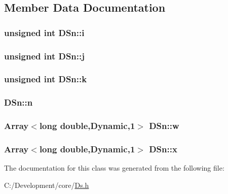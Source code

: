 \subsection{Member Data Documentation}
\hypertarget{class_d_sn_a205b8a78bdbeee3ed57ad7969ee7246e}{
\subsubsection[{i}]{\setlength{\rightskip}{0pt plus 5cm}unsigned int D\-Sn\-::i\hspace{0.3cm}{\ttfamily [private]}}}\label{class_d_sn_a205b8a78bdbeee3ed57ad7969ee7246e}
\hypertarget{class_d_sn_afe7eb12770bc91d87a1fe74ac2929b46}{
\subsubsection[{j}]{\setlength{\rightskip}{0pt plus 5cm}unsigned int D\-Sn\-::j\hspace{0.3cm}{\ttfamily [private]}}}\label{class_d_sn_afe7eb12770bc91d87a1fe74ac2929b46}
\hypertarget{class_d_sn_abbfbd2fec8d17081897e5cf755374149}{
\subsubsection[{k}]{\setlength{\rightskip}{0pt plus 5cm}unsigned int D\-Sn\-::k\hspace{0.3cm}{\ttfamily [private]}}}\label{class_d_sn_abbfbd2fec8d17081897e5cf755374149}
\hypertarget{class_d_sn_a9ff951d6dab4a24ba0296ea175b0962c}{
\subsubsection[{n}]{ D\-Sn\-::n\hspace{0.3cm}{\ttfamily [private]}}}\label{class_d_sn_a9ff951d6dab4a24ba0296ea175b0962c}
\hypertarget{class_d_sn_aebd6954764715ae6dfbb14a7d934b404}{
\subsubsection[{w}]{\setlength{\rightskip}{0pt plus 5cm}Array$<$long double,Dynamic,1$>$ D\-Sn\-::w\hspace{0.3cm}{\ttfamily [private]}}}\label{class_d_sn_aebd6954764715ae6dfbb14a7d934b404}
\hypertarget{class_d_sn_aa25ce8fbec334c9388d6a3592b8e1366}{
\subsubsection[{x}]{\setlength{\rightskip}{0pt plus 5cm}Array$<$long double,Dynamic,1$>$ D\-Sn\-::x\hspace{0.3cm}{\ttfamily [private]}}}\label{class_d_sn_aa25ce8fbec334c9388d6a3592b8e1366}


The documentation for this class was generated from the following file\-:\begin{DoxyCompactItemize}
\item 
C\-:/\-Development/core/\hyperlink{_ds_8h}{Ds.\-h}\end{DoxyCompactItemize}
